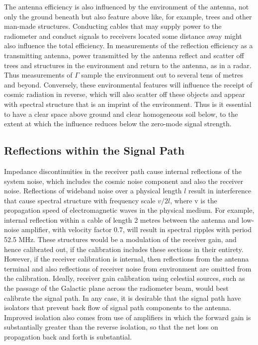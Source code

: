    The antenna efficiency is also influenced by the environment of the antenna, not only the ground beneath but also feature above like, for example, trees and other man-made structures.  Conducting cables that may supply power to the radiometer and conduct signals to receivers located some distance away might also influence the total efficiency.  In measurements of the reflection efficiency as a transmitting antenna, power transmitted by the antenna reflect and scatter off trees and structures in the environment and return to the antenna, as in a radar. Thus measurements of $\Gamma$ sample the environment out to several tens of metres and beyond.  Conversely, these environmental features will influence the receipt of cosmic radiation in reverse, which will also scatter off these objects and appear with spectral structure that is an imprint of the environment.  Thus is it essential to have a clear space above ground and clear homogeneous soil below, to the extent at which the influence reduces below the zero-mode signal strength.
   
\subsection{Reflections within the Signal Path}

  Impedance discontinuities in the receiver path cause internal reflections of the system noise, which includes the cosmic noise component and also the receiver noise.  Reflections of wideband noise over a physical length $l$ result in interference that cause spectral structure with frequency scale $v/2l$, where v is the propagation speed of electromagnetic waves in the physical medium.  For example, internal reflection within a cable of length 2 metres between the antenna and low-noise amplifier, with velocity factor 0.7, will result in spectral ripples with period 52.5 MHz. These structures would be a modulation of the receiver gain, and hence calibrated out, if the calibration includes these sections in their entirety.  However, if the receiver calibration is internal, then reflections from the antenna terminal and also reflections of receiver noise from environment are omitted from the calibration.  Ideally, receiver gain calibration using celestial sources, such as the passage of the Galactic plane across the radiometer beam, would best calibrate the signal path.  In any case, it is desirable that the signal path have isolators that prevent back flow of signal path components to the antenna.  Improved isolation also comes from use of amplifiers in which the forward gain is substantially greater than the reverse isolation, so that the net loss on propagation back and forth is substantial.
  
